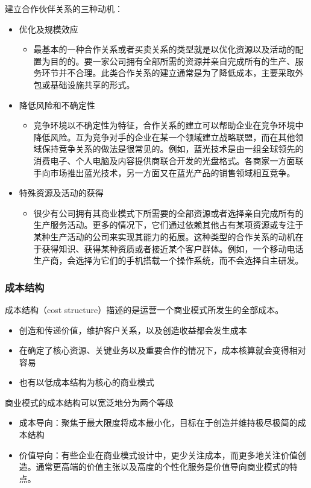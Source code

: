 	建立合作伙伴关系的三种动机：
	\begin{itemize}
		\item 优化及规模效应
		\begin{itemize}
			\item 最基本的一种合作关系或者买卖关系的类型就是以优化资源以及活动的配置为目的的。要一家公司拥有全部所需的资源并亲自完成所有的生产、服务环节并不合理。此类合作关系的建立通常是为了降低成本，主要采取外包或基础设施共享的形式。
		\end{itemize}
		\item 降低风险和不确定性
		\begin{itemize}
			\item 竞争环境以不确定性为特征，合作关系的建立可以帮助企业在竞争环境中降低风险。互为竞争对手的企业在某一个领域建立战略联盟，而在其他领域保持竞争关系的做法是很常见的。例如，蓝光技术是由一组全球领先的消费电子、个人电脑及内容提供商联合开发的光盘格式。各商家一方面联手向市场推出蓝光技术，另一方面又在蓝光产品的销售领域相互竞争。
		\end{itemize}
		\item 特殊资源及活动的获得
		\begin{itemize}
			\item 很少有公司拥有其商业模式下所需要的全部资源或者选择亲自完成所有的生产服务活动。更多的情况下，它们通过依赖其他占有某项资源或专注于某种生产活动的公司来实现其能力的拓展。这种类型的合作关系的动机在于获得知识、获得某种资质或者接近某个客户群体。例如，一个移动电话生产商，会选择为它们的手机搭载一个操作系统，而不会选择自主研发。
		\end{itemize}
	\end{itemize}

	\subsubsection{成本结构}
	成本结构（cost structure）描述的是运营一个商业模式所发生的全部成本。
	\begin{itemize}
		\item 创造和传递价值，维护客户关系，以及创造收益都会发生成本
		\item 在确定了核心资源、关键业务以及重要合作的情况下，成本核算就会变得相对容易
		\item 也有以低成本结构为核心的商业模式
	\end{itemize}

	商业模式的成本结构可以宽泛地分为两个等级
	\begin{itemize}
		\item 成本导向：聚焦于最大限度将成本最小化，目标在于创造并维持极尽极简的成本结构
		\item 价值导向：有些企业在商业模式设计中，更少关注成本，而更多地关注价值创造。通常更高端的价值主张以及高度的个性化服务是价值导向商业模式的特点。
	\end{itemize}

